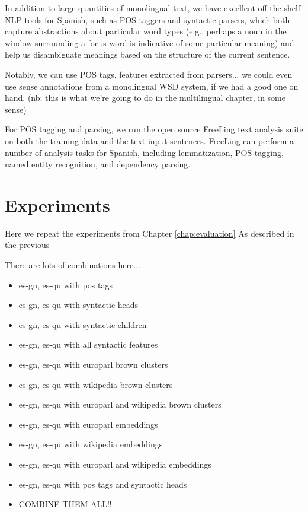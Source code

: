 In addition to large quantities of monolingual text, we have excellent
off-the-shelf NLP tools for Spanish, such as POS taggers and syntactic parsers,
which both capture abstractions about particular word types (e.g., perhaps a
noun in the window surrounding a focus word is indicative of some particular
meaning) and help us disambiguate meanings based on the structure of the
current sentence.

Notably, we can use POS tags, features extracted from parsers... we could even
use sense annotations from a monolingual WSD system, if we had a good one on
hand. (nb: this is what we're going to do in the multilingual chapter, in some
sense)

For POS tagging and parsing, we run the open source FreeLing text analysis
suite \cite{padro12} on both the training data and the text input sentences.
FreeLing can perform a number of analysis tasks for Spanish, including
lemmatization, POS tagging, named entity recognition, and dependency parsing.


\section{Experiments}
Here we repeat the experiments from Chapter \ref{chap:evaluation}
As described in the previous

There are lots of combinations here...

\begin{itemize}
  \item es-gn, es-qu with pos tags
  \item es-gn, es-qu with syntactic heads
  \item es-gn, es-qu with syntactic children
  \item es-gn, es-qu with all syntactic features
\end{itemize}

\begin{itemize}
  \item es-gn, es-qu with europarl brown clusters
  \item es-gn, es-qu with wikipedia brown clusters
  \item es-gn, es-qu with europarl and wikipedia brown clusters
\end{itemize}

\begin{itemize}
  \item es-gn, es-qu with europarl embeddings
  \item es-gn, es-qu with wikipedia embeddings
  \item es-gn, es-qu with europarl and wikipedia embeddings
  \item es-gn, es-qu with pos tags and syntactic heads
\end{itemize}

\begin{itemize}
  \item COMBINE THEM ALL!!
\end{itemize}
